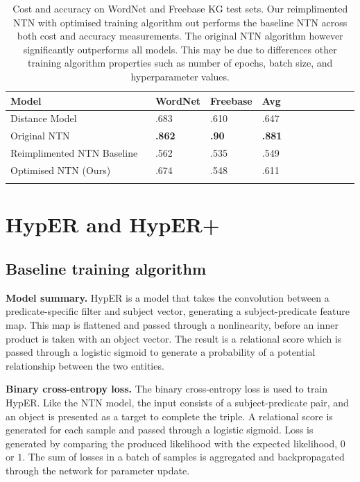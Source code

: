 \begin{table}[H]
	\centering
	\begin{tabular}{lllllllllll}
  		\textbf{Model} & \textbf{WordNet} & \textbf{Freebase} & \textbf{Avg} \\
  		\hline
  		Distance Model \unskip ~\citep{bordes2011learning} & .683 & .610 & .647 \\
  		Original NTN \unskip ~\citep{socher2013reasoning} & \textbf{.862} & \textbf{.90} & \textbf{.881} \\
  		Reimplimented NTN Baseline  \unskip ~\citep{Doss2015} & .562 & .535 & .549 \\
  		\hline
  		Optimised NTN (Ours) & .674 & .548 & .611 \\
		&
	\end{tabular}
	\captionsetup{justification=centering}
	\caption{Cost and accuracy on WordNet and Freebase KG test sets. Our reimplimented NTN with optimised training algorithm out performs the baseline NTN across both cost and accuracy measurements. The original NTN algorithm however significantly outperforms all models. This may be due to differences other training algorithm properties such as number of epochs, batch size, and hyperparameter values.}
\end{table}



\section{HypER and HypER+}

\subsection{Baseline training algorithm}
\textbf{Model summary.} HypER is a model that takes the convolution between a predicate-specific filter and subject vector, generating a subject-predicate feature map. This map is flattened and passed through a nonlinearity, before an inner product is taken with an object vector. The result is a relational score which is passed through a logistic sigmoid to generate a probability of a potential relationship between the two entities. \par

\noindent \textbf{Binary cross-entropy loss.} The binary cross-entropy loss is used to train HypER. Like the NTN model, the input consists of a subject-predicate pair, and an object is presented as a target to complete the triple. A relational score is generated for each sample and passed through a logistic sigmoid. Loss is generated by comparing the produced likelihood with the expected likelihood, $ 0 $ or $ 1 $. The sum of losses in a batch of samples is aggregated and backpropagated through the network for parameter update. \par

